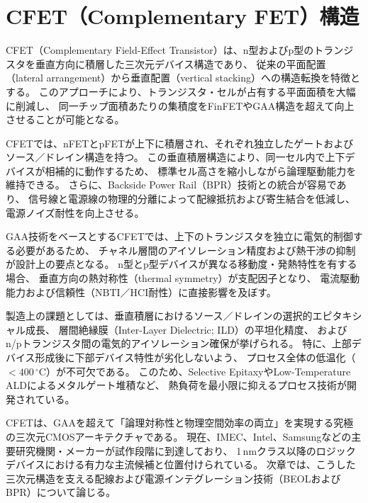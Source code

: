 \section{CFET（Complementary FET）構造}
CFET（Complementary Field-Effect Transistor）は、n型およびp型のトランジスタを垂直方向に積層した三次元デバイス構造であり、  
従来の平面配置（lateral arrangement）から垂直配置（vertical stacking）への構造転換を特徴とする。  
このアプローチにより、トランジスタ・セルが占有する平面面積を大幅に削減し、  
同一チップ面積あたりの集積度をFinFETやGAA構造を超えて向上させることが可能となる。

CFETでは、nFETとpFETが上下に積層され、それぞれ独立したゲートおよびソース／ドレイン構造を持つ。  
この垂直積層構造により、同一セル内で上下デバイスが相補的に動作するため、  
標準セル高さを縮小しながら論理駆動能力を維持できる。  
さらに、Backside Power Rail（BPR）技術との統合が容易であり、  
信号線と電源線の物理的分離によって配線抵抗および寄生結合を低減し、電源ノイズ耐性を向上させる。

GAA技術をベースとするCFETでは、上下のトランジスタを独立に電気的制御する必要があるため、  
チャネル層間のアイソレーション精度および熱干渉の抑制が設計上の要点となる。  
n型とp型デバイスが異なる移動度・発熱特性を有する場合、  
垂直方向の熱対称性（thermal symmetry）が支配因子となり、  
電流駆動能力および信頼性（NBTI／HCI耐性）に直接影響を及ぼす。

製造上の課題としては、垂直積層におけるソース／ドレインの選択的エピタキシャル成長、  
層間絶縁膜（Inter-Layer Dielectric; ILD）の平坦化精度、  
およびn/pトランジスタ間の電気的アイソレーション確保が挙げられる。  
特に、上部デバイス形成後に下部デバイス特性が劣化しないよう、  
プロセス全体の低温化（$<400\,^{\circ}\mathrm{C}$）が不可欠である。  
このため、Selective EpitaxyやLow-Temperature ALDによるメタルゲート堆積など、  
熱負荷を最小限に抑えるプロセス技術が開発されている。

CFETは、GAAを超えて「論理対称性と物理空間効率の両立」を実現する究極の三次元CMOSアーキテクチャである。  
現在、IMEC、Intel、Samsungなどの主要研究機関・メーカーが試作段階に到達しており、  
1\,nmクラス以降のロジックデバイスにおける有力な主流候補と位置付けられている。  
次章では、こうした三次元構造を支える配線および電源インテグレーション技術（BEOLおよびBPR）について論じる。



